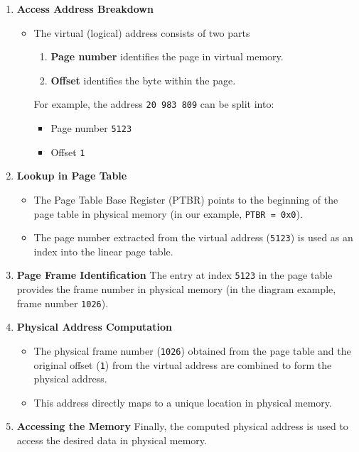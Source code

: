 \documentclass[../../compsys.tex]{subfiles}
\begin{document}
\begin{enumerate}
    \item \textbf{Access Address Breakdown}
    \begin{itemize}
      \item[] The virtual (logical) address consists of two parts
        \begin{enumerate}
            \item \textbf{Page number} identifies the page in virtual memory.
            \item \textbf{Offset} identifies the byte within the page.
        \end{enumerate}
        For example, the address \texttt{20 983 809} can be split into:
        \begin{itemize}
            \item Page number \texttt{5123}
            \item Offset \texttt{1}
        \end{itemize}
    \end{itemize}

    \item \textbf{Lookup in Page Table}
    \begin{itemize}
        \item The Page Table Base Register (PTBR) points to the beginning of the page table in physical memory (in our example, \texttt{PTBR = 0x0}).
        \item The page number extracted from the virtual address (\texttt{5123}) is used as an index into the linear page table.
    \end{itemize}

    \item \textbf{Page Frame Identification} The entry at index \texttt{5123} in the page table provides the frame number in physical memory (in the diagram example, frame number \texttt{1026}).


    \item \textbf{Physical Address Computation}
    \begin{itemize}
        \item The physical frame number (\texttt{1026}) obtained from the page table and the original offset (\texttt{1}) from the virtual address are combined to form the physical address.
        \item This address directly maps to a unique location in physical memory.
    \end{itemize}

    \item \textbf{Accessing the Memory} Finally, the computed physical address is used to access the desired data in physical memory.
\end{enumerate}
\end{document}
